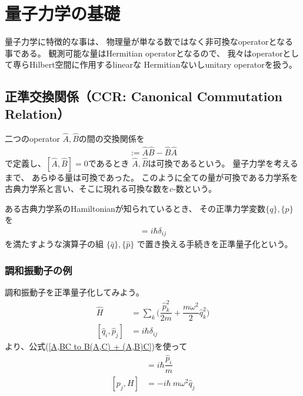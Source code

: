 \section{量子力学の基礎}

量子力学に特徴的な事は、
物理量が単なる数ではなく非可換なoperatorとなる事である。
観測可能な量はHermitian operatorとなるので、
我々はoperatorとして専らHilbert空間に作用するlinearな
Hermitianないしunitary operatorを扱う。

\subsection{正準交換関係（CCR: Canonical Commutation Relation）}

二つのoperator $\hat{A}, \hat{B}$の間の交換関係を
\begin{align}
    [\hat{A}, \hat{B}] := \hat{A} \hat{B} - \hat{B} \hat{A}
\end{align}
で定義し、$[\hat{A}, \hat{B}] = 0$であるとき
$\hat{A}, \hat{B}$は可換であるという。
量子力学を考えるまで、
あらゆる量は可換であった。
このように全ての量が可換である力学系を
古典力学系と言い、そこに現れる可換な数を$c$-数という。

ある古典力学系のHamiltonianが知られているとき、
その正準力学変数$\{q\},\{p\}$を
\begin{align}
    [ \hat{q}_i , \hat{p}_j ] = i\hbar \delta_{ij}
\end{align}
を満たすような演算子の組
$ \{\hat{q}\} , \{\hat{p}\} $
で置き換える手続きを正準量子化という。

\subsubsection{調和振動子の例}

調和振動子を正準量子化してみよう。
\begin{align}
    \hat{H} &= \sum_k \bigg(
        \dfrac{ \hat{p}_k^2 }{2m} 
    +
        \dfrac{ m\omega^2 }{2} \hat{q}_k^2
    \bigg)
\\
    [ \hat{q}_i , \hat{p}_j ] &= i\hbar \delta_{ij}
\end{align}
より、公式(\ref{A,BC to B(A,C) + (A,B)C})を使って
\begin{align}
    [q_i, H] &= i\hbar \dfrac{ \hat{p}_i }{m} 
\\
    [p_j, H] &= - i \hbar\ m\omega^2 \hat{q}_j
\end{align}
